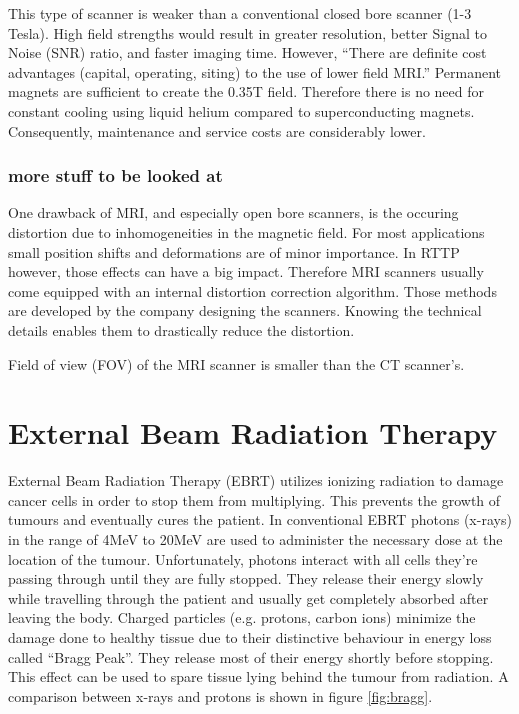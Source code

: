 This type of scanner is weaker than a conventional closed bore scanner (1-3 Tesla).
High field strengths would result in greater resolution, better Signal to Noise (SNR) ratio, and faster imaging time.
However, ``There are definite cost advantages (capital, operating, siting) to the use of lower field MRI.'' \cite{Rutt1996}
Permanent magnets are sufficient to create the 0.35T field.
Therefore there is no need for constant cooling using liquid helium compared to superconducting magnets.
Consequently, maintenance and service costs are considerably lower.


\subsubsection{more stuff to be looked at}
One drawback of MRI, and especially open bore scanners, is the occuring distortion due to inhomogeneities in the magnetic field.
For most applications small position shifts and deformations are of minor importance.
In RTTP however, those effects can have a big impact.
Therefore MRI scanners usually come equipped with an internal distortion correction algorithm.
Those methods are developed by the company designing the scanners. Knowing the technical details enables them to drastically reduce the distortion.

Field of view (FOV) of the MRI scanner is smaller than the CT scanner's.

\section{External Beam Radiation Therapy}
\label{sec:planning}
External Beam Radiation Therapy (EBRT) utilizes ionizing radiation to damage cancer cells in order to stop them from multiplying.
This prevents the growth of tumours and eventually cures the patient. 
In conventional EBRT photons (x-rays) in the range of 4MeV to 20MeV are used to administer the necessary dose at the location of the tumour. Unfortunately, photons interact with all cells
they're passing through until they are fully stopped. They release their energy slowly while travelling through the patient and usually get completely absorbed after leaving the body.
Charged particles (e.g. protons, carbon ions) minimize the damage done to healthy tissue due to their distinctive behaviour in energy loss called ``Bragg Peak''.
They release most of their energy shortly before stopping. \cite{Nakamura2010} This effect can be used to spare tissue lying behind the tumour from radiation. \cite{Paganetti2005} %
A comparison between x-rays and protons is shown in figure \ref{fig:bragg}.

